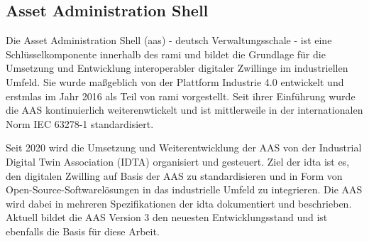 

\newpage
\subsection{Asset Administration Shell}
\label{chap:AAS}



Die Asset Administration Shell (\ac{aas}) - deutsch Verwaltungsschale - ist eine Schlüsselkomponente innerhalb des \ac{rami} \cite{RAMI4.0} und bildet die Grundlage für die Umsetzung und Entwicklung interoperabler digitaler Zwillinge im industriellen Umfeld.
Sie wurde maßgeblich von der Plattform Industrie 4.0 entwickelt und erstmlas im Jahr 2016 als Teil von \acs{rami} vorgestellt.
Seit ihrer Einführung wurde die AAS kontinuierlich weiterenwtickelt und ist mittlerweile in der internationalen Norm IEC 63278-1 \cite{AASIEC63278} standardisiert.

Seit 2020 wird die Umsetzung und Weiterentwicklung der AAS von der Industrial Digital Twin Association (IDTA) \cite{IDTA} organisiert und gesteuert.
Ziel der \acs{idta} ist es, den digitalen Zwilling auf Basis der AAS zu standardisieren und in Form von Open-Source-Softwarelösungen in das industrielle Umfeld zu integrieren.
Die AAS wird dabei in mehreren Spezifikationen der \acs{idta} dokumentiert und beschrieben.
Aktuell bildet die AAS Version 3 den neuesten Entwicklungsstand und ist ebenfalls die Basis für diese Arbeit.

